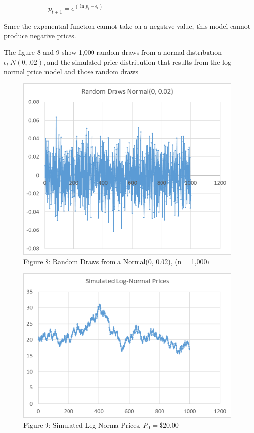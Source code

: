 \documentclass[
  letterpaper,
  DIV=11,
  numbers=noendperiod]{scrreprt}
\begin{document}
~~~~~~~~~~~~~\(p_{t+1} = e^{(\ln{p_{t}} + \epsilon_t)}\)

Since the exponential function cannot take on a negative value, this
model cannot produce negative prices.

The figure 8 and 9 show 1,000 random draws from a normal distribution
\(\epsilon_t ~ N(0, .02)\), and the simulated price distribution that
results from the log-normal price model and those random draws.

\begin{figure}

{\centering \includegraphics{Excel-files/IntroductiontoCommodityTS-random_walk_files/image007.png}

}

\caption{Figure 8: Random Draws from a Normal(0, 0.02), (n = 1,000)}

\end{figure}

\begin{figure}

{\centering \includegraphics{Excel-files/IntroductiontoCommodityTS-random_walk_files/image005.png}

}

\caption{Figure 9: Simulated Log-Norma Prices, \(P_0 = \$20.00\)}

\end{figure}
\end{document}
